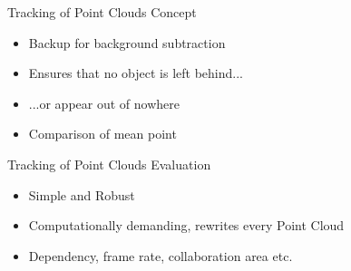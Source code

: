 
\begin{frame}{Tracking of Point Clouds}
Concept
	\begin{itemize}
	\item Backup for background subtraction
	\item Ensures that no object is left behind...
	\item ...or appear out of nowhere
	\item Comparison of mean point
	\end{itemize}
\end{frame}

\begin{frame}{Tracking of Point Clouds}
Evaluation
	\begin{itemize}
	\item Simple and Robust
	\item Computationally demanding, rewrites every Point Cloud
	\item Dependency, frame rate, collaboration area etc.
	\end{itemize}
\end{frame}